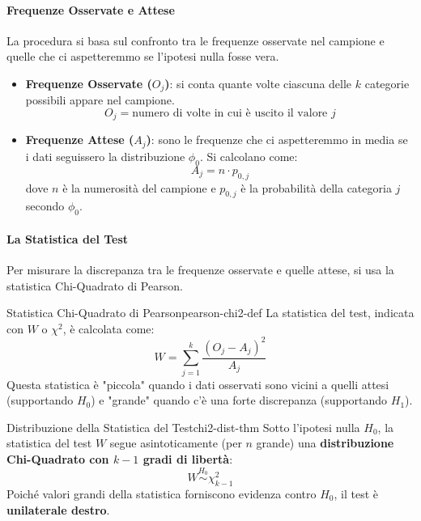 \paragraph{Frequenze Osservate e Attese}
La procedura si basa sul confronto tra le frequenze osservate nel campione e
quelle che ci aspetteremmo se l'ipotesi nulla fosse vera.
\begin{itemize}
    \item \textbf{Frequenze Osservate (\(O_j\))}: si conta quante volte ciascuna
    delle \(k\) categorie possibili appare nel campione.
    \[ O_j = \text{numero di volte in cui è uscito il valore } j \]
    \item \textbf{Frequenze Attese (\(A_j\))}: sono le frequenze che ci
    aspetteremmo in media se i dati seguissero la distribuzione \(\phi_0\). Si
    calcolano come:
    \[ A_j = n \cdot p_{0,j} \]
    dove \(n\) è la numerosità del campione e \(p_{0,j}\) è la probabilità
    della categoria \(j\) secondo \(\phi_0\).
\end{itemize}

\paragraph{La Statistica del Test}
Per misurare la discrepanza tra le frequenze osservate e quelle attese, si usa
la statistica Chi-Quadrato di Pearson.

\begin{definizione}{Statistica Chi-Quadrato di Pearson}{pearson-chi2-def}
La statistica del test, indicata con \(W\) o \(\chi^2\), è calcolata come:
\[ W = \sum_{j=1}^{k} \frac{(O_j - A_j)^2}{A_j} \]
Questa statistica è "piccola" quando i dati osservati sono vicini a quelli
attesi (supportando \(H_0\)) e "grande" quando c'è una forte discrepanza
(supportando \(H_1\)).
\end{definizione}

\begin{teorema}{Distribuzione della Statistica del Test}{chi2-dist-thm}
Sotto l'ipotesi nulla \(H_0\), la statistica del test \(W\) segue
asintoticamente (per \(n\) grande) una \textbf{distribuzione Chi-Quadrato con
\(k-1\) gradi di libertà}:
\[ W \stackrel{H_0}{\sim} \chi^2_{k-1} \]
Poiché valori grandi della statistica forniscono evidenza contro \(H_0\), il
test è \textbf{unilaterale destro}.
\end{teorema}

